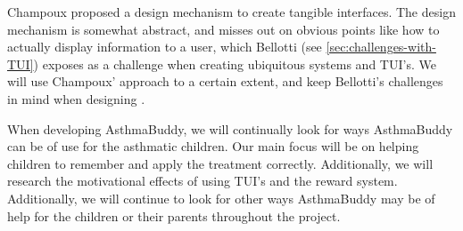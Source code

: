 Champoux proposed a design mechanism to create tangible interfaces. The design mechanism is somewhat abstract, and misses out on obvious points like how to actually display information to a user, which Bellotti \etal{} (see \ref{sec:challenges-with-TUI}) exposes as a challenge when creating ubiquitous systems and TUI's. We will use Champoux' approach to a certain extent, and keep Bellotti's challenges in mind when designing \buddy{}.   

When developing AsthmaBuddy, we will continually look for ways AsthmaBuddy can be of use for the asthmatic children. Our main focus will be on helping children to remember and apply the treatment correctly. Additionally, we will research the motivational effects of using TUI's and the reward system. Additionally, we will continue to look for other ways AsthmaBuddy may be of help for the children or their parents throughout the project.  

 